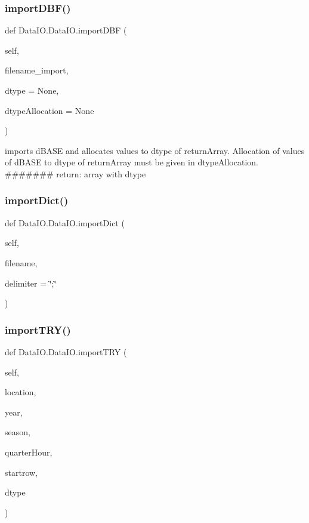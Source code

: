\subsubsection{\texorpdfstring{import\+D\+B\+F()}{importDBF()}}
{\footnotesize\ttfamily def Data\+I\+O.\+Data\+I\+O.\+import\+D\+BF (\begin{DoxyParamCaption}\item[{}]{self,  }\item[{}]{filename\+\_\+import,  }\item[{}]{dtype = {\ttfamily None},  }\item[{}]{dtype\+Allocation = {\ttfamily None} }\end{DoxyParamCaption})}

\begin{DoxyVerb}imports dBASE and allocates values to dtype of returnArray. Allocation
of values of dBASE to dtype of returnArray must be given in 
dtypeAllocation.
#######
return:
   array with dtype
\end{DoxyVerb}
 \mbox{\label{class_data_i_o_1_1_data_i_o_a57bc5372c9aa1d722c0d8e0cf1b749dd}} 
\subsubsection{\texorpdfstring{import\+Dict()}{importDict()}}
{\footnotesize\ttfamily def Data\+I\+O.\+Data\+I\+O.\+import\+Dict (\begin{DoxyParamCaption}\item[{}]{self,  }\item[{}]{filename,  }\item[{}]{delimiter = {\ttfamily \char`\"{};\char`\"{}} }\end{DoxyParamCaption})}

\mbox{\label{class_data_i_o_1_1_data_i_o_a232251f90f75e5e8e307a035f191d1c4}} 
\subsubsection{\texorpdfstring{import\+T\+R\+Y()}{importTRY()}}
{\footnotesize\ttfamily def Data\+I\+O.\+Data\+I\+O.\+import\+T\+RY (\begin{DoxyParamCaption}\item[{}]{self,  }\item[{}]{location,  }\item[{}]{year,  }\item[{}]{season,  }\item[{}]{quarter\+Hour,  }\item[{}]{startrow,  }\item[{}]{dtype }\end{DoxyParamCaption})}

